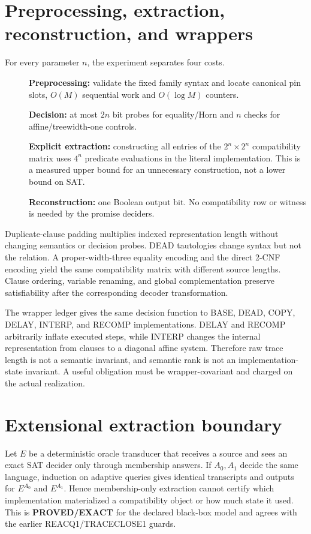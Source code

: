 \documentclass[11pt]{article}
\begin{document}
\section{Preprocessing, extraction, reconstruction, and wrappers}
For every parameter $n$, the experiment separates four costs.
\begin{description}
\item[] \textbf{Preprocessing:} validate the fixed family syntax and locate
canonical pin slots, $O(M)$ sequential work and $O(\log M)$ counters.
\item[] \textbf{Decision:} at most $2n$ bit probes for equality/Horn and $n$
checks for affine/treewidth-one controls.
\item[] \textbf{Explicit extraction:} constructing all entries of the
$2^n\times2^n$ compatibility matrix uses $4^n$ predicate evaluations in the
literal implementation.  This is a measured upper bound for an unnecessary
construction, not a lower bound on SAT.
\item[] \textbf{Reconstruction:} one Boolean output bit.  No compatibility
row or witness is needed by the promise deciders.
\end{description}

Duplicate-clause padding multiplies indexed representation length without
changing semantics or decision probes.  DEAD tautologies change syntax but
not the relation.  A proper-width-three equality encoding and the direct
2-CNF encoding yield the same compatibility matrix with different source
lengths.  Clause ordering, variable renaming, and global complementation
preserve satisfiability after the corresponding decoder transformation.

The wrapper ledger gives the same decision function to BASE, DEAD, COPY,
DELAY, INTERP, and RECOMP implementations.  DELAY and RECOMP arbitrarily
inflate executed steps, while INTERP changes the internal representation from
clauses to a diagonal affine system.  Therefore raw trace length is not a
semantic invariant, and semantic rank is not an implementation-state
invariant.  A useful obligation must be wrapper-covariant and charged on the
actual realization.

\section{Extensional extraction boundary}
Let $E$ be a deterministic oracle transducer that receives a source and sees
an exact SAT decider only through membership answers.  If $A_0,A_1$ decide the
same language, induction on adaptive queries gives identical transcripts and
outputs for $E^{A_0}$ and $E^{A_1}$.  Hence membership-only extraction cannot
certify which implementation materialized a compatibility object or how much
state it used.  This is \textbf{PROVED/EXACT} for the declared black-box model
and agrees with the earlier REACQ1/TRACECLOSE1 guards.
\end{document}
